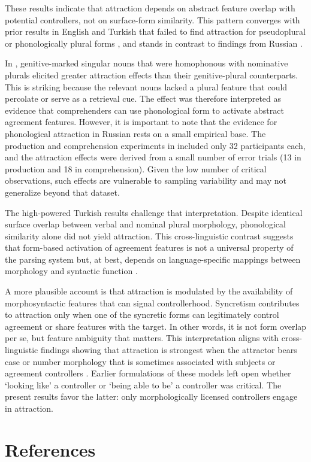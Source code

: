 \documentclass[
  authoryear,
  3p]{elsarticle}
\begin{document}
These results indicate that attraction depends on abstract feature
overlap with potential controllers, not on surface-form similarity. This
pattern converges with prior results in English and Turkish that failed
to find attraction for pseudoplural or phonologically plural forms
\citep{BockEberhard1993, HaskellMacDonald2003, NicolEtAl:2016}, and
stands in contrast to findings from Russian \citep{Slioussar2018}.

In \citet{Slioussar2018}, genitive-marked singular nouns that were
homophonous with nominative plurals elicited greater attraction effects
than their genitive-plural counterparts. This is striking because the
relevant nouns lacked a plural feature that could percolate or serve as
a retrieval cue. The effect was therefore interpreted as evidence that
comprehenders can use phonological form to activate abstract agreement
features. However, it is important to note that the evidence for
phonological attraction in Russian rests on a small empirical base. The
production and comprehension experiments in \citep{Slioussar2018}
included only 32 participants each, and the attraction effects were
derived from a small number of error trials (13 in production and 18 in
comprehension). Given the low number of critical observations, such
effects are vulnerable to sampling variability and may not generalize
beyond that dataset.

The high-powered Turkish results challenge that interpretation. Despite
identical surface overlap between verbal and nominal plural morphology,
phonological similarity alone did not yield attraction. This
cross-linguistic contrast suggests that form-based activation of
agreement features is not a universal property of the parsing system
but, at best, depends on language-specific mappings between morphology
and syntactic function \citep{DillonKeshev2024}.

A more plausible account is that attraction is modulated by the
availability of morphosyntactic features that can signal controllerhood.
Syncretism contributes to attraction only when one of the syncretic
forms can legitimately control agreement or share features with the
target. In other words, it is not form overlap per se, but feature
ambiguity that matters. This interpretation aligns with cross-linguistic
findings showing that attraction is strongest when the attractor bears
case or number morphology that is sometimes associated with subjects or
agreement controllers
\citep{LagoEtAl2019, BhatiaDillon2022, BleotuDillon2024, HartsuikerEtAl2003}.
Earlier formulations of these models left open whether `looking like' a
controller or `being able to be' a controller was critical. The present
results favor the latter: only morphologically licensed controllers
engage in attraction.

\section*{References}\label{references}

\newcommand{\doi}[1]{\href{http://dx.doi.org/#1}{http://dx.doi.org/#1}}
\begingroup
\raggedright
\singlespacing

\renewcommand{\bibsection}{}


\endgroup
\end{document}
